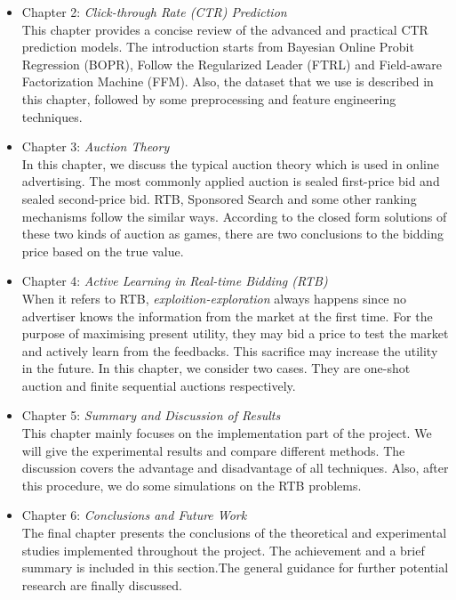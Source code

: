 \begin{itemize}

 \item Chapter 2: \emph{Click-through Rate (CTR) Prediction} \\
This chapter provides a concise review of the advanced and practical CTR prediction models. The introduction starts from Bayesian Online Probit Regression (BOPR), Follow the Regularized Leader (FTRL) and Field-aware Factorization Machine (FFM). Also, the dataset that we use is described in this chapter, followed by some preprocessing and feature engineering techniques.

\item Chapter 3: \emph{Auction Theory} \\
In this chapter, we discuss the typical auction theory which is used in online advertising. The most commonly applied auction is sealed first-price bid and sealed second-price bid. RTB, Sponsored Search and some other ranking mechanisms follow the similar ways. According to the closed form solutions of these two kinds of auction as games, there are two conclusions to the bidding price based on the true value. 

\item Chapter 4: \emph{Active Learning in Real-time Bidding (RTB)} \\
When it refers to RTB, \emph{exploition-exploration} always happens since no advertiser knows the information from the market at the first time. For the purpose of maximising present utility, they may bid a price to test the market and actively learn from the feedbacks. This sacrifice may increase the utility in the future. In this chapter, we consider two cases. They are one-shot auction and finite sequential auctions respectively.

\item Chapter 5: \emph{Summary and Discussion of Results} \\
This chapter mainly focuses on the implementation part of the project. We will give the experimental results and compare different methods. The discussion covers the advantage and disadvantage of all techniques. Also, after this procedure, we do some simulations on the RTB problems. 

\item Chapter 6: \emph{Conclusions and Future Work} \\
The final chapter presents the conclusions of the theoretical and experimental studies implemented throughout the project. The achievement and a brief summary is included in this section.The general guidance for further potential research are finally discussed.

\end{itemize}

